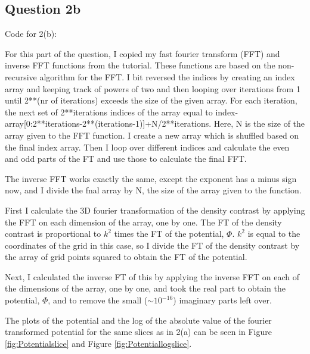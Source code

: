 \subsection{Question 2b}

Code for 2(b):


For this part of the question, I copied my fast fourier transform (FFT) and inverse FFT functions from the tutorial.
These functions are based on the non-recursive algorithm for the FFT.
I bit reversed the indices by creating an index array and keeping track of powers of two and then looping over iterations from 1 until 2**(nr of iterations) exceeds the size of the given array.
For each iteration, the next set of 2**iterations indices of the array equal to index-array[0:2**iterations-2**(iterations-1)]+N/2**iterations.
Here, N is the size of the array given to the FFT function.
I create a new array which is shuffled based on the final index array.
Then I loop over different indices and calculate the even and odd parts of the FT and use those to calculate the final FFT.

The inverse FFT works exactly the same, except the exponent has a minus sign now, and I divide the fnal array by N, the size of the array given to the function.

First I calculate the 3D fourier transformation of the density contrast by applying the FFT on each dimension of the array, one by one.
The FT of the density contrast is proportional to $k^2$ times the FT of the potential, $\Phi$.
$k^2$ is equal to the coordinates of the grid in this case, so I divide the FT of the density contrast by the array of grid points squared to obtain the FT of the potential.

Next, I calculated the inverse FT of this by applying the inverse FFT on each of the dimensions of the array, one by one, and took the real part to obtain the potential, $\Phi$, and to remove the small ($\sim 10^{-16}$) imaginary parts left over.

The plots of the potential and the log of the absolute value of the fourier transformed potential for the same slices as in 2(a) can be seen in Figure \ref{fig:Potentialslice} and Figure \ref{fig:Potentiallogslice}.

